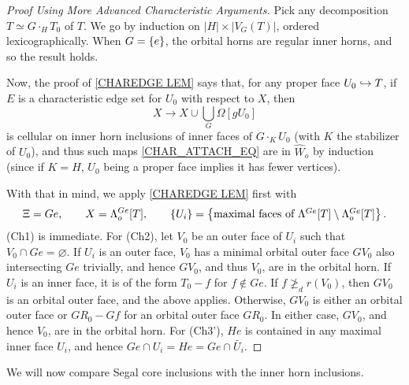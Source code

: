 \documentclass[a4paper,10pt,draft]{article}%
\begin{document}
\begin{proof}[Proof Using More Advanced Characteristic Arguments]
      Pick any decomposition $T \simeq G \cdot_H T_0$ of $T$.
      We go by induction on $|H| \times |V_G(T)|$, ordered lexicographically. 
      When $G = \left\{e\right\}$, the orbital horns are regular inner horns, and so the result holds.

      Now, the proof of \cref{CHAREDGE LEM}
      says that,
      for any proper face $U_0 \hookrightarrow T$,
      if $E$ is a characteristic edge set for $U_0$ with respect to $X$, then
      \begin{equation}
            \label{CHAR_ATTACH_EQ}
            X \to X \cup \mathop{\bigcup}\limits_G \Omega[g U_0]
      \end{equation}
      is cellular on inner horn inclusions of inner faces of $G \cdot_K U_0$ (with $K$ the stabilizer of $U_0$),
      and thus such maps \eqref{CHAR_ATTACH_EQ} are in $\hat{W}_o$ by induction
      (since if $K = H$, $U_0$ being a proper face implies it has fewer vertices).

      With that in mind, we apply \cref{CHAREDGE LEM} first with
      \begin{equation}
            \Xi = G e,
            \qquad X = \Lambda^{G e}_o[T],
            \qquad \left\{U_i\right\} = \left\{\mbox{maximal faces of $\Lambda^{G e}[T] \setminus \Lambda^{G e}_o[T]$}\right\}.
      \end{equation}
      (Ch1) is immediate.
      For (Ch2), let $V_0$ be an outer face of $U_i$ such that $V_0 \cap G e = \varnothing$.
      If $U_i$ is an outer face,
      $V_0$ has a minimal orbital outer face $G V_0$ also intersecting $G e$ trivially,
      and hence $G V_0$, and thus $V_0$, are in the orbital horn.
      If $U_i$ is an inner face, it is of the form $T_0 - f$ for $f \notin G e$.
      If $f \not \geq_d r(V_0)$, then $G V_0$ is an orbital outer face, and the above applies.
      Otherwise, $G V_0$ is either an orbital outer face or $G R_0 - G f$ for an orbital outer face $G R_0$.
      In either case, $G V_0$, and hence $V_0$, are in the orbital horn.
      For (Ch3'), $H e$ is contained in any maximal inner face $U_i$, and hence
      $G e \cap U_i = H e = G e \cap \bar U_i$.
\end{proof}


We will now compare Segal core inclusions with the inner horn inclusions.
\end{document}
